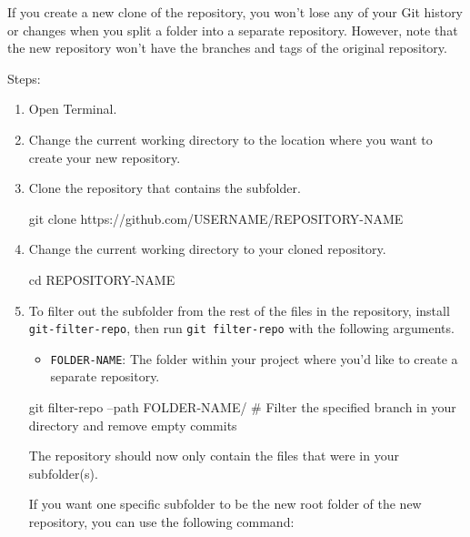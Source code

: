  If you create a new clone of the repository, you won't lose any of your Git history or changes when you split a folder into a separate repository. However, note that the new repository won't have the branches and tags of the original repository. 

 Steps:
 \begin{enumerate}
    \item Open Terminal.
    \item Change the current working directory to the location where you want to create your new repository.
    \item Clone the repository that contains the subfolder.
    \begin{codeblock}[language=bash]
git clone https://github.com/USERNAME/REPOSITORY-NAME 
    \end{codeblock}
    \item Change the current working directory to your cloned repository.
    \begin{codeblock}[language=bash]
cd REPOSITORY-NAME 
    \end{codeblock}
    \item To filter out the subfolder from the rest of the files in the repository, install \texttt{git-filter-repo}, then run \texttt{git filter-repo} with the following arguments.
    \begin{itemize}
        \item \texttt{FOLDER-NAME}: The folder within your project where you'd like to create a separate repository.
    \end{itemize}
    \begin{codeblock}[language=bash]
git filter-repo --path FOLDER-NAME/
# Filter the specified branch in your directory and remove empty commits 
    \end{codeblock}
    The repository should now only contain the files that were in your subfolder(s).
    
    If you want one specific subfolder to be the new root folder of the new repository, you can use the following command:


\end{enumerate}
